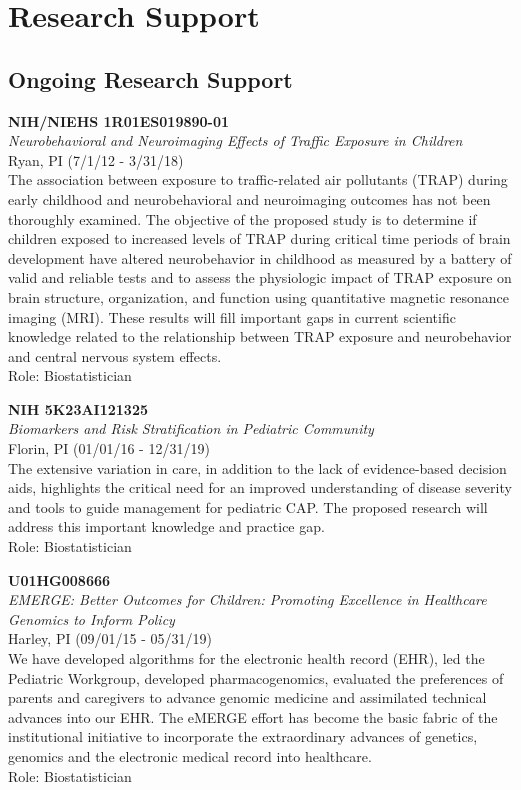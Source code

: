 \documentclass{nihbiosketch}
\begin{document}
\section{Research Support}

\subsection*{Ongoing Research Support}

\bigskip

\textbf{NIH/NIEHS 1R01ES019890-01}\\
\emph{Neurobehavioral and Neuroimaging Effects of Traffic Exposure in
	Children}\\
Ryan, PI (7/1/12 - 3/31/18)\\
The association between exposure to traffic-related air pollutants
(TRAP) during early childhood and neurobehavioral and neuroimaging
outcomes has not been thoroughly examined. The objective of the proposed
study is to determine if children exposed to increased levels of TRAP
during critical time periods of brain development have altered
neurobehavior in childhood as measured by a battery of valid and
reliable tests and to assess the physiologic impact of TRAP exposure on
brain structure, organization, and function using quantitative magnetic
resonance imaging (MRI). These results will fill important gaps in
current scientific knowledge related to the relationship between TRAP
exposure and neurobehavior and central nervous system effects.\\
Role: Biostatistician

\bigskip

\textbf{NIH 5K23AI121325}\\
\emph{Biomarkers and Risk Stratification in Pediatric Community}\\
Florin, PI (01/01/16 - 12/31/19)\\
The extensive variation in care, in addition to the lack of
evidence-based decision aids, highlights the critical need for an
improved understanding of disease severity and tools to guide management
for pediatric CAP. The proposed research will address this important
knowledge and practice gap.\\
Role: Biostatistician

\bigskip

\textbf{U01HG008666}\\
\emph{EMERGE: Better Outcomes for Children: Promoting Excellence in
	Healthcare Genomics to Inform Policy}\\
Harley, PI (09/01/15 - 05/31/19)\\
We have developed algorithms for the electronic health record (EHR), led
the Pediatric Workgroup, developed pharmacogenomics, evaluated the
preferences of parents and caregivers to advance genomic medicine and
assimilated technical advances into our EHR. The eMERGE effort has
become the basic fabric of the institutional initiative to incorporate
the extraordinary advances of genetics, genomics and the electronic
medical record into healthcare.\\
Role: Biostatistician
\end{document}
